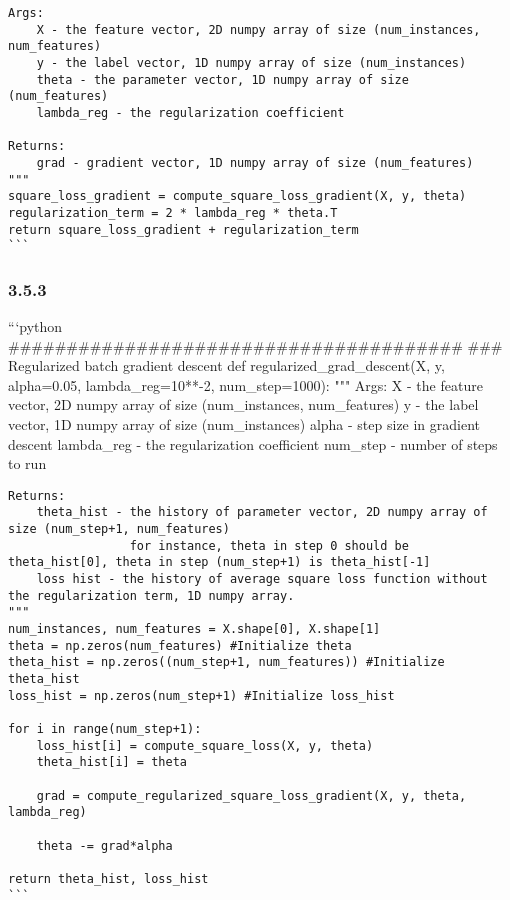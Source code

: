 \documentclass[11pt]{article}
\begin{document}
\begin{verbatim}
Args:
    X - the feature vector, 2D numpy array of size (num_instances, num_features)
    y - the label vector, 1D numpy array of size (num_instances)
    theta - the parameter vector, 1D numpy array of size (num_features)
    lambda_reg - the regularization coefficient

Returns:
    grad - gradient vector, 1D numpy array of size (num_features)
"""
square_loss_gradient = compute_square_loss_gradient(X, y, theta)
regularization_term = 2 * lambda_reg * theta.T
return square_loss_gradient + regularization_term
```
\end{verbatim}

    \subsubsection{3.5.3}\label{section}

    ```python
\#\#\#\#\#\#\#\#\#\#\#\#\#\#\#\#\#\#\#\#\#\#\#\#\#\#\#\#\#\#\#\#\#\#\#\#\#\#\#
\#\#\# Regularized batch gradient descent def
regularized\_grad\_descent(X, y, alpha=0.05, lambda\_reg=10**-2,
num\_step=1000): """ Args: X - the feature vector, 2D numpy array of
size (num\_instances, num\_features) y - the label vector, 1D numpy
array of size (num\_instances) alpha - step size in gradient descent
lambda\_reg - the regularization coefficient num\_step - number of steps
to run

\begin{verbatim}
Returns:
    theta_hist - the history of parameter vector, 2D numpy array of size (num_step+1, num_features)
                 for instance, theta in step 0 should be theta_hist[0], theta in step (num_step+1) is theta_hist[-1]
    loss hist - the history of average square loss function without the regularization term, 1D numpy array.
"""
num_instances, num_features = X.shape[0], X.shape[1]
theta = np.zeros(num_features) #Initialize theta
theta_hist = np.zeros((num_step+1, num_features)) #Initialize theta_hist
loss_hist = np.zeros(num_step+1) #Initialize loss_hist

for i in range(num_step+1):
    loss_hist[i] = compute_square_loss(X, y, theta)
    theta_hist[i] = theta

    grad = compute_regularized_square_loss_gradient(X, y, theta, lambda_reg)

    theta -= grad*alpha

return theta_hist, loss_hist
```
\end{verbatim}
\end{document}
